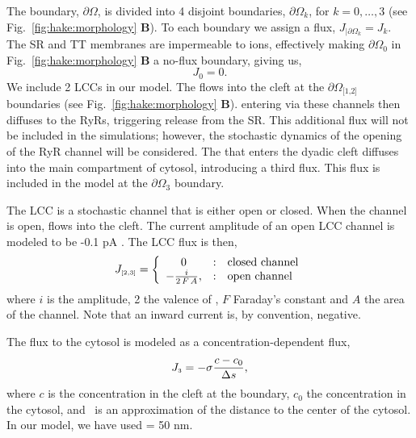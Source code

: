 The boundary, $\partial\Omega$, is divided into 4 disjoint boundaries,
$\partial\Omega_k$, for $k=0,\ldots,3$ (see
Fig.~\ref{fig:hake:morphology} \textbf{B}). To each boundary we assign
a flux, $J_{|\partial\Omega_k}=J_k$. The SR and TT membranes are
impermeable to ions, effectively making
$\partial\Omega_{\scriptscriptstyle\text{0}}$ in
Fig.~\ref{fig:hake:morphology} \textbf{B} a no-flux boundary, giving
us,
\begin{equation}
  \label{eq:hake:no-flux}
  J_{\scriptscriptstyle 0}= 0.
\end{equation}
We include 2 LCCs in our model. The \Ca flows into the cleft at the
$\partial\Omega_{\scriptscriptstyle\text{[1,2]}}$ boundaries (see
Fig.~\ref{fig:hake:morphology} \textbf{B}). \Ca entering via these
channels then diffuses to the RyRs, triggering \Ca release from the
SR. This additional \Ca flux will not be included in the simulations;
however, the stochastic dynamics of the opening of the RyR channel
will be considered. The \Ca that enters the dyadic cleft diffuses into
the main compartment of cytosol, introducing a third flux. This flux
is included in the model at the
$\partial\Omega_{\scriptscriptstyle\text{3}}$ boundary.\par

The LCC is a stochastic channel that is either open or closed. When
the channel is open, \Ca flows into the cleft. The current amplitude
of an open LCC channel is modeled to be -0.1 pA
\cite{GuiaSternLakattaEtAl2001}. The LCC flux is then,
\begin{equation}
\label{eq:hake:constant-current-flux}
J_{\scriptscriptstyle[2,3]}= \left\{
  \begin{array}{c@{\quad:\quad}l}
    0& \text{closed channel}\\
    - \frac{i}{2\,F\,A},& \text{open channel}
  \end{array}
\right.
\end{equation}
\noindent where $i$ is the amplitude, 2 the valence of \Ca, $F$
Faraday's constant and $A$ the area of the channel. Note that an
inward current is, by convention, negative.\par
The flux to the cytosol is modeled as a concentration-dependent flux,
\begin{equation}
  \label{eq:hake:conc-dependent-flux}
  J_{\scriptscriptstyle 3}= -\sigma\frac{c - c_0}{\Delta{}s},
\end{equation}
where $c$ is the concentration in the cleft at the boundary, $c_0$ the
concentration in the cytosol, and \Ds~is an approximation of the
distance to the center of the cytosol. In our model, we have used \Ds
= 50 nm.\par

